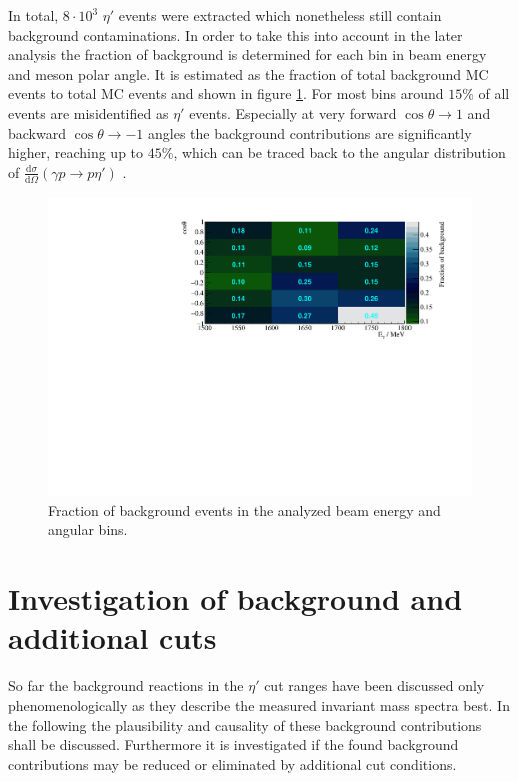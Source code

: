 In total, $8\cdot10^3$ $\eta'$ events were extracted which nonetheless still contain background contaminations. In order to take this into account in the later analysis the fraction of background is determined for each bin in beam energy and meson polar angle. It is estimated as the fraction of total background MC events to total MC events and shown in figure \ref{fig:bkg}. For most bins around $15\%$ of all events are misidentified as $\eta'$ events. Especially at very forward $\cos\theta\to1$ and backward $\cos\theta\to-1$ angles the background contributions are significantly higher, reaching up to $45\%$, which can be traced back to the angular distribution of $\frac{\text{d}\sigma}{\text{d}\Omega}\left(\gamma p \to p\eta'\right)$ \cite{etap_cs}.
\begin{figure}[htbp]
	\centering
	\includegraphics[width=\linewidth]{../figs/hydrogen/bin_cuts/invcut_bkg_percentage.pdf}
	\caption{Fraction of background events in the analyzed beam energy and angular bins.}
	\label{fig:bkg}
\end{figure}

\section{Investigation of background and additional cuts} 
\label{sec:bkg}
So far the background reactions in the $\eta'$ cut ranges have been discussed only phenomenologically as they describe the measured invariant mass spectra best. In the following the plausibility and causality of these background contributions shall be discussed. Furthermore it is investigated if the found background contributions may be reduced or eliminated by additional cut conditions.

